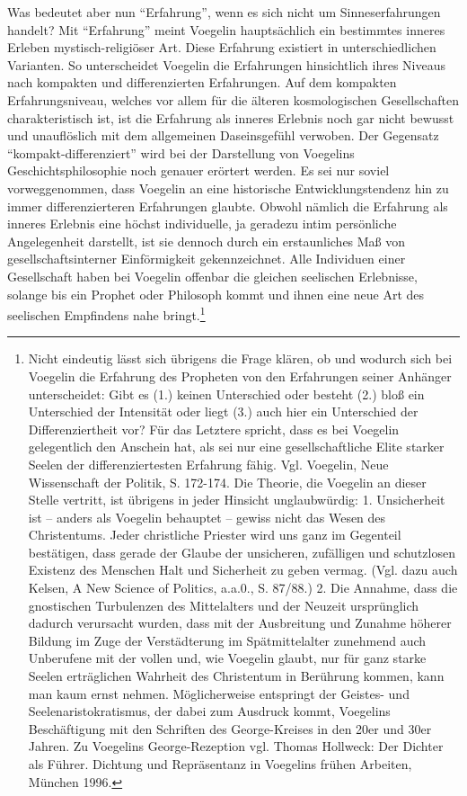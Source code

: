 Was bedeutet aber nun "`Erfahrung"', wenn es sich nicht um Sinneserfahrungen
handelt? Mit "`Erfahrung"' meint Voegelin hauptsächlich ein bestimmtes inneres
Erleben mystisch-religiöser Art.  Diese Erfahrung existiert in
unterschiedlichen Varianten. So unterscheidet Voegelin die Erfahrungen
hinsichtlich ihres Niveaus nach kompakten und differenzierten Erfahrungen. Auf
dem kompakten Erfahrungsniveau, welches vor allem für die älteren
kosmologischen Gesellschaften charakteristisch ist, ist die Erfahrung als
inneres Erlebnis noch gar nicht bewusst und unauflöslich mit dem allgemeinen
Daseinsgefühl verwoben. Der Gegensatz "`kompakt-differenziert"' wird bei der
Darstellung von Voegelins Geschichtsphilosophie noch genauer erörtert werden.
Es sei nur soviel vorweggenommen, dass Voegelin an eine historische
Entwicklungstendenz hin zu immer differenzierteren Erfahrungen glaubte. Obwohl
nämlich die Erfahrung als inneres Erlebnis eine höchst individuelle, ja
geradezu intim persönliche Angelegenheit darstellt, ist sie dennoch durch ein
erstaunliches Maß von gesellschaftsinterner Einförmigkeit gekennzeichnet. Alle
Individuen einer Gesellschaft haben bei Voegelin offenbar die gleichen
seelischen Erlebnisse, solange bis ein Prophet oder Philosoph kommt und ihnen
eine neue Art des seelischen Empfindens nahe bringt.\footnote{Nicht eindeutig
  lässt sich übrigens die Frage klären, ob und wodurch sich bei Voegelin die
  Erfahrung des Propheten von den Erfahrungen seiner Anhänger unterscheidet:
  Gibt es (1.) keinen Unterschied oder besteht (2.) bloß ein Unterschied der
  Intensität oder liegt (3.) auch hier ein Unterschied der Differenziertheit
  vor? Für das Letztere spricht, dass es bei Voegelin gelegentlich den
  Anschein hat, als sei nur eine gesellschaftliche Elite starker Seelen der
  differenziertesten Erfahrung fähig. Vgl. Voegelin, Neue Wissenschaft der
  Politik, S. 172-174. Die Theorie, die Voegelin an dieser Stelle vertritt,
  ist übrigens in jeder Hinsicht unglaubwürdig: 1. Unsicherheit ist -- anders
  als Voegelin behauptet -- gewiss nicht das Wesen des Christentums. Jeder
  christliche Priester wird uns ganz im Gegenteil bestätigen, dass gerade der
  Glaube der unsicheren, zufälligen und schutzlosen Existenz des Menschen Halt
  und Sicherheit zu geben vermag. (Vgl. dazu auch Kelsen, A New Science of
  Politics, a.a.0., S. 87/88.) 2. Die Annahme, dass die gnostischen
  Turbulenzen des Mittelalters und der Neuzeit ursprünglich dadurch verursacht
  wurden, dass mit der Ausbreitung und Zunahme höherer Bildung im Zuge der
  Verstädterung im Spätmittelalter zunehmend auch Unberufene mit der vollen
  und, wie Voegelin glaubt, nur für ganz starke Seelen erträglichen Wahrheit
  des Christentum in Berührung kommen, kann man kaum ernst nehmen.
  Möglicherweise entspringt der Geistes- und Seelenaristokratismus, der dabei
  zum Ausdruck kommt, Voegelins Beschäftigung mit den Schriften des
  George-Kreises in den 20er und 30er Jahren. Zu Voegelins George-Rezeption
  vgl. Thomas Hollweck: Der Dichter als Führer. Dichtung und Repräsentanz in
  Voegelins frühen Arbeiten, München 1996.}

